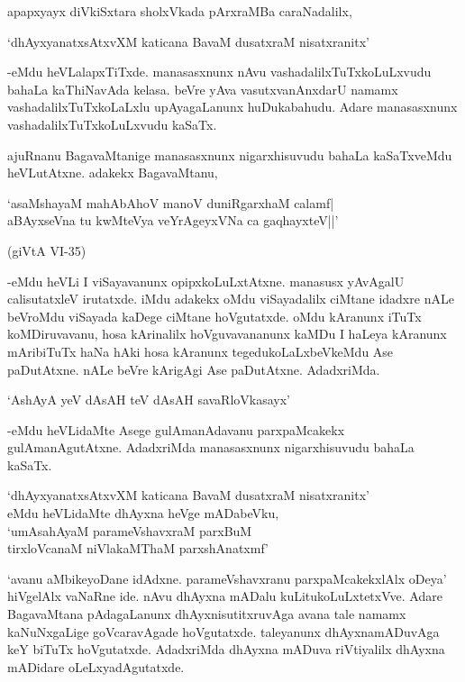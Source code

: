 apapxyayx diVkiSxtara sholxVkada pArxraMBa caraNadalilx,

\begin{shloka}
`dhAyxyanatxsAtxvXM katicana BavaM dusatxraM nisatxranitx'
\end{shloka}

-eMdu heVLalapxTiTxde. manasasxnunx nAvu vashadalilxTuTxkoLuLxvudu bahaLa kaThiNavAda kelasa. beVre yAva vasutxvanAnxdarU namamx vashadalilxTuTxkoLaLxlu upAyagaLanunx huDukabahudu. Adare manasasxnunx vashadalilxTuTxkoLuLxvudu kaSaTx.

ajuRnanu BagavaMtanige manasasxnunx nigarxhisuvudu bahaLa kaSaTxveMdu heVLutAtxne. adakekx BagavaMtanu,

\begin{shloka}
`asaMshayaM mahAbAhoV manoV duniRgarxhaM calamf|\\
aBAyxseVna tu kwMteVya veYrAgeyxVNa ca gaqhayxteV||'\\
\begin{flushright}
(giVtA {\eng VI-35})
\end{flushright}
\end{shloka}

-eMdu heVLi I viSayavanunx opipxkoLuLxtAtxne. manasusx yAvAgalU calisutatxleV irutatxde. iMdu adakekx oMdu viSayadalilx ciMtane idadxre nALe beVroMdu viSayada kaDege ciMtane hoVgutatxde. oMdu kAranunx iTuTx koMDiruvavanu, hosa kArinalilx hoVguvavananunx kaMDu I haLeya kAranunx mAribiTuTx haNa hAki hosa kAranunx tegedukoLaLxbeVkeMdu Ase paDutAtxne. nALe beVre kArigAgi Ase paDutAtxne. AdadxriMda.

\begin{shloka}
`AshAyA yeV dAsAH teV dAsAH savaRloVkasayx'
\end{shloka}

-eMdu heVLidaMte Asege gulAmanAdavanu parxpaMcakekx gulAmanAgutAtxne. AdadxriMda manasasxnunx nigarxhisuvudu bahaLa kaSaTx.

\begin{shloka}
`dhAyxyanatxsAtxvXM katicana BavaM dusatxraM nisatxranitx'\\
eMdu heVLidaMte dhAyxna heVge mADabeVku,\\
`umAsahAyaM parameVshavxraM parxBuM\\
tirxloVcanaM niVlakaMThaM parxshAnatxmf'
\end{shloka}

`avanu aMbikeyoDane idAdxne. parameVshavxranu parxpaMcakekxlAlx oDeya' hiVgelAlx vaNaRne ide. nAvu dhAyxna mADalu kuLitukoLuLxtetxVve. Adare BagavaMtana pAdagaLanunx dhAyxnisutitxruvAga avana tale namamx kaNuNxgaLige goVcaravAgade hoVgutatxde. taleyanunx dhAyxnamADuvAga keY biTuTx hoVgutatxde. AdadxriMda dhAyxna mADuva riVtiyalilx dhAyxna mADidare oLeLxyadAgutatxde.

